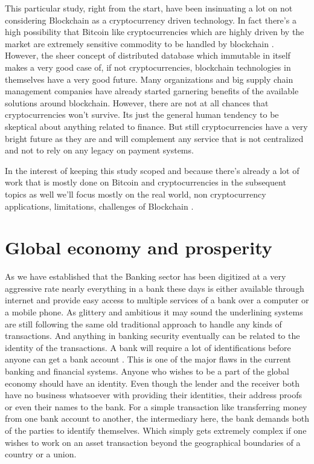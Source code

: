 This particular study, right from the start, have been insinuating a lot on not considering Blockchain as a cryptocurrency driven technology. In fact there's a high possibility that Bitcoin like cryptocurrencies which are highly driven by the market are extremely sensitive commodity to be handled by blockchain \cite{iyke5}. However, the sheer concept of distributed database which immutable in itself makes a very good case of, if not cryptocurrencies, blockchain technologies in themselves have a very good future. Many organizations and big supply chain management companies have already started garnering benefits of the available solutions around blockchain. However, there are not at all chances that cryptocurrencies won't survive. Its just the general human tendency to be skeptical about anything related to finance. But still cryptocurrencies have a very bright future as they are and will complement any service that is not centralized and not to rely on any legacy on payment systems.

In the interest of keeping this study scoped and because there's already a lot of work that is mostly done on Bitcoin and cryptocurrencies in the subsequent topics as well we'll focus mostly on the real world, non cryptocurrency applications, limitations, challenges of Blockchain \cite{yli18}.


\section{Global economy and prosperity}
As we have established that the Banking sector has been digitized at a very aggressive rate nearly everything in a bank these days is either available through internet and provide easy access to multiple services of a bank over a computer or a mobile phone. As glittery and ambitious it may sound the underlining systems are still following the same old traditional approach to handle any kinds of transactions. And anything in banking security eventually can be related to the identity of the transactions. A bank will require a lot of identifications before anyone can get a bank account \cite{cocco14}. This is one of the major flaws in the current banking and financial systems. Anyone who wishes to be a part of the global economy should have an identity. Even though the lender and the receiver both have no business whatsoever with providing their identities, their address proofs or even their names to the bank. For a simple transaction like transferring money from one bank account to another, the intermediary here, the bank demands both of the parties to identify themselves. Which simply gets extremely complex if one wishes to work on an asset transaction beyond the geographical boundaries of a country or a union.

